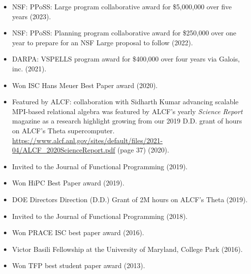 \begin{itemize}
\item NSF: PPoSS: Large program collaborative award for \$5,000,000 over five years (2023).
\item NSF: PPoSS: Planning program collaborative award for \$250,000 over one year to prepare for an NSF Large proposal to follow (2022).
\item DARPA: VSPELLS program award for \$400,000 over four years via Galois, inc. (2021).
\item Won ISC Hans Meuer Best Paper award (2020).
\item Featured by ALCF: collaboration with Sidharth Kumar advancing scalable MPI-based relational algebra was featured by ALCF's yearly \emph{Science Report} magazine as a research highlight growing from our 2019 D.D. grant of hours on ALCF's Theta supercomputer. \url{https://www.alcf.anl.gov/sites/default/files/2021-04/ALCF_2020ScienceReport.pdf} (page 37) (2020).
\item Invited to the Journal of Functional Programming (2019).
\item Won HiPC Best Paper award (2019).
\item DOE Directors Direction (D.D.) Grant of 2M hours on ALCF's Theta (2019).
\item Invited to the Journal of Functional Programming (2018).
\item Won PRACE ISC best paper award (2016).
\item Victor Basili Fellowship at the University of Maryland, College Park (2016).
\item Won TFP best student paper award (2013).
\end{itemize}
